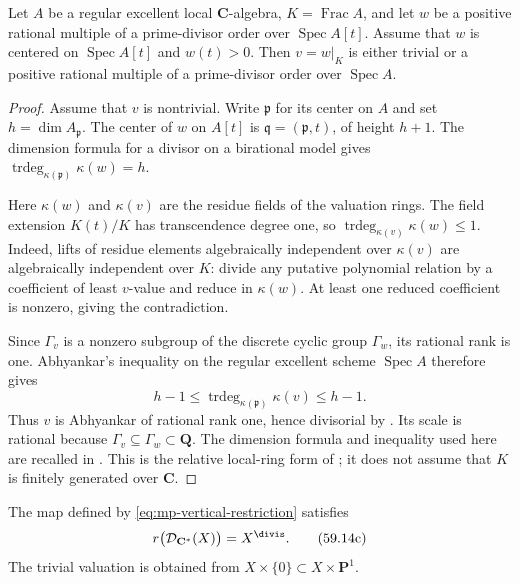 \begin{lemma}\label{lem:mp-local-vertical-restriction}
Let $A$ be a regular excellent local $\mathbf C$-algebra,
$K=\operatorname{Frac}A$, and let $w$ be a positive rational
multiple of a prime-divisor order over $\operatorname{Spec}A[t]$.
Assume that $w$ is centered on $\operatorname{Spec}A[t]$ and
$w(t)>0$. Then $v=w|_K$ is either trivial or a positive rational
multiple of a prime-divisor order over $\operatorname{Spec}A$.
\end{lemma}

\begin{proof}
Assume that $v$ is nontrivial. Write $\mathfrak p$ for its center
on $A$ and set $h=\dim A_{\mathfrak p}$. The center of $w$ on
$A[t]$ is $\mathfrak q=(\mathfrak p,t)$, of height $h+1$.
The dimension formula for a divisor on a birational model gives
$\operatorname{trdeg}_{\kappa(\mathfrak p)}\kappa(w)=h$.

Here $\kappa(w)$ and $\kappa(v)$ are the residue fields of the
valuation rings. The field extension $K(t)/K$ has transcendence
degree one, so
$\operatorname{trdeg}_{\kappa(v)}\kappa(w)\leq1$.
Indeed, lifts of residue elements algebraically independent over
$\kappa(v)$ are algebraically independent over $K$: divide any
putative polynomial relation by a coefficient of least $v$-value
and reduce in $\kappa(w)$. At least one reduced coefficient is
nonzero, giving the contradiction.

Since $\Gamma_v$ is a nonzero subgroup of the discrete cyclic
group $\Gamma_w$, its rational rank is one. Abhyankar's
inequality on the regular excellent scheme $\operatorname{Spec}A$
therefore gives
\[
 h-1\leq\operatorname{trdeg}_{\kappa(\mathfrak p)}\kappa(v)
       \leq h-1.
\]
Thus $v$ is Abhyankar of rational rank one, hence divisorial by
\cite[Proposition~3.7 and Remark~3.9]{JM12}. Its scale is rational
because $\Gamma_v\subseteq\Gamma_w\subset\mathbf Q$.
The dimension formula and inequality used here are recalled in
\cite[Section~3.2, equation~(3.4)]{JM12}. This is the relative
local-ring form of \cite[Lemma~4.1]{BHJ17}; it does not assume
that $K$ is finitely generated over $\mathbf C$.
\end{proof}

\begin{theorem}\label{thm:mp-invariant-divisorial-comparison}
The map defined by \eqref{eq:mp-vertical-restriction} satisfies
\[
                       r\bigl(\mathcal D_{\mathbf C^*}(X)\bigr)
                          =X^{\divis}.
\tag{59.14c}\label{eq:mp-invariant-divisorial-comparison}
\]
The trivial valuation is obtained from
$X\times\{0\}\subset X\times\mathbf P^1$.
\end{theorem}

